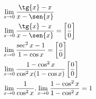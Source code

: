\begin{ex}
\begin{align}
&\lim_{x\rightarrow 0} \frac{\tg{x}-x}{x-\sen{x}}\nonumber\\
&\lim_{x\rightarrow 0} \frac{\tg{x}-x}{x-\sen{x}}=\left[\frac{0}{0}\right]\nonumber\\
&\lim_{x\rightarrow 0} \frac{\sec^2{x}-1}{1-\cos{x}}=\left[\frac{0}{0}\right]\nonumber\\
&\lim_{x\rightarrow 0} \frac{1-\cos^2{x}}{\cos^2{x}(1-\cos{x})}\left[\frac{0}{0}\right]\nonumber\\
&\lim_{x\rightarrow 0} \frac{1}{\cos^2{x}}.\lim_{x\rightarrow 0} \frac{1-\cos^2{x}}{1-\cos^2{x}}=1\nonumber
\end{align}
\end{ex}